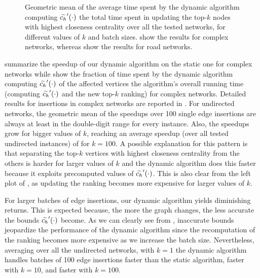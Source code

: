 \begin{figure}[tb]
\caption{Geometric mean of the average time spent by the dynamic algorithm
computing $\widetilde{c_h}'(\cdot)$ \wrt the total time spent in updating the top-$k$ nodes
with highest closeness centrality over all the tested networks, for different
values of $k$ and batch sizes.
show the results for complex networks,
whereas
show the results for road networks.}
\label{fig:dyn-topk-breakdown}
\end{figure}

summarize the speedup of our dynamic algorithm on the static one for complex
networks while 
show the fraction of time spent by the dynamic algorithm computing $\widetilde{c_h}'(\cdot)$ of
the affected vertices \wrt the algorithm's overall running time (\ie computing
$\widetilde{c_h}'(\cdot)$ and the new top-$k$ ranking) for complex networks.
Detailed results for insertions in complex networks are reported in
.
%
For undirected networks, the geometric mean of the speedups over 100 single
edge insertions are always at least in the double-digit range for every instance.
Also, the speedups grow for bigger values of $k$, reaching an average speedup (over
all tested undirected instances) of \speedupComplexUndInsertKHundredBOne for
$k = 100$. A possible explanation for this pattern is that separating the top-$k$
vertices with highest closeness centrality from the others is harder for larger
values of $k$ and the dynamic algorithm does this faster because it exploits
precomputed values of $\widetilde{c_h}'(\cdot)$. This is also clear from the left plot of
, as updating the ranking becomes more
expensive for larger values of $k$.

For larger batches of edge insertions, our dynamic algorithm yields diminishing
returns. This is expected because, the more the graph changes, the less accurate
the bounds $\widetilde{c_h}'(\cdot)$ become. As we can clearly see from
, inaccurate bounds jeopardize the
performance of the dynamic algorithm since the recomputation of the ranking becomes
more expensive as we increase the batch size.
Nevertheless, averaging over all the undirected networks, with $k = 1$ the dynamic
algorithm handles batches of 100 edge insertions
\speedupComplexUndInsertKOneBHundred faster than the static algorithm,
\speedupComplexUndInsertKTenBHundred faster with $k = 10$, and
\speedupComplexUndInsertKHundredBHundred faster with $k = 100$.

